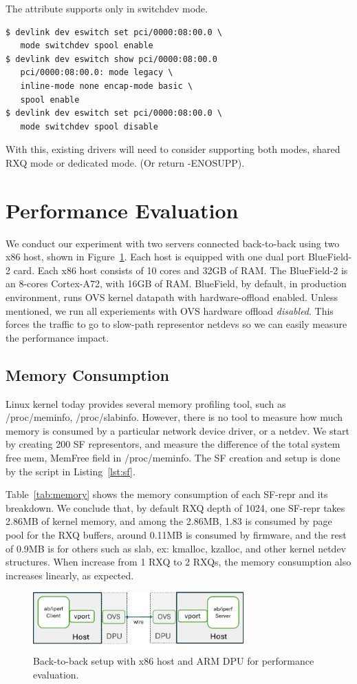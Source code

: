 \documentclass[letterpaper]{article}
\begin{document}
The attribute supports only in switchdev mode.
\begin{Verbatim}[fontsize=\small]
$ devlink dev eswitch set pci/0000:08:00.0 \
   mode switchdev spool enable
$ devlink dev eswitch show pci/0000:08:00.0
   pci/0000:08:00.0: mode legacy \
   inline-mode none encap-mode basic \
   spool enable
$ devlink dev eswitch set pci/0000:08:00.0 \
   mode switchdev spool disable
\end{Verbatim}

With this, existing drivers will need to consider supporting both
modes, shared RXQ mode or dedicated mode. (Or return -ENOSUPP).

\section{Performance Evaluation}

We conduct our experiment with two servers connected back-to-back using
two x86 host, shown in Figure~\ref{fig:testbed}.
Each host is equipped with one dual port BlueField-2 card.
Each x86 host consists of 10 cores and 32GB of RAM. The BlueField-2
is an 8-cores Cortex-A72, with 16GB of RAM. BlueField, by default, in 
production environment, runs OVS kernel datapath with hardware-offload enabled.
Unless mentioned, we run all experiements with OVS hardware offload \emph{disabled}.
This forces the traffic to go to slow-path representor netdevs so we can
easily measure the performance impact.

\subsection{Memory Consumption}
Linux kernel today provides several memory profiling tool, such as /proc/meminfo,
/proc/slabinfo. However, there is no tool to measure how much memory is consumed
by a particular network device driver, or a netdev. We start by creating 200 SF representors,
and measure the difference of the total system free mem, MemFree field in /proc/meminfo.
The SF creation and setup is done by the script in Listing~\ref{lst:sf}.

Table~\ref{tab:memory} shows the memory consumption of each SF-repr and its breakdown.
We conclude that, by default RXQ depth of 1024, one SF-repr takes 2.86MB of kernel
memory, and among the 2.86MB, 1.83 is consumed by page pool for the RXQ buffers,
around 0.11MB is consumed by firmware, and the rest of 0.9MB is for others
such as slab, ex: kmalloc, kzalloc, and other kernel netdev structures.
When increase from 1 RXQ to 2 RXQs, the memory consumption also increases linearly, as expected.
\begin{figure}[t!]
\includegraphics[width=3.2in]{testbed.pdf}
\centering
\caption{Back-to-back setup with x86 host and ARM DPU for performance evaluation.}
\label{fig:testbed}
\end{figure}
\end{document}
